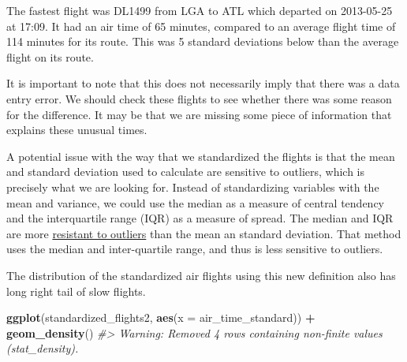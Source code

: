 \documentclass[]{book}
\newenvironment{Shaded}{\begin{snugshade}}{\end{snugshade}}
\newcommand{\CommentTok}[1]{\textcolor[rgb]{0.56,0.35,0.01}{\textit{#1}}}
\newcommand{\DataTypeTok}[1]{\textcolor[rgb]{0.13,0.29,0.53}{#1}}
\newcommand{\KeywordTok}[1]{\textcolor[rgb]{0.13,0.29,0.53}{\textbf{#1}}}
\newcommand{\NormalTok}[1]{#1}
\newcommand{\OperatorTok}[1]{\textcolor[rgb]{0.81,0.36,0.00}{\textbf{#1}}}
\newcommand{\StringTok}[1]{\textcolor[rgb]{0.31,0.60,0.02}{#1}}
\theoremstyle{plain}
\theoremstyle{remark}
\begin{document}
The fastest flight was DL1499 from LGA to
ATL which departed on
2013-05-25 at 17:09.
It had an air time of 65 minutes, compared to an average
flight time of 114 minutes for its route.
This was 5 standard deviations below
than the average flight on its route.

It is important to note that this does not necessarily imply that there was a data entry error.
We should check these flights to see whether there was some reason for the difference.
It may be that we are missing some piece of information that explains these unusual times.

A potential issue with the way that we standardized the flights is that the mean and standard deviation used to calculate are sensitive to outliers, which is precisely what we are
looking for.
Instead of standardizing variables with the mean and variance, we could use the median
as a measure of central tendency and the interquartile range (IQR) as a measure of spread.
The median and IQR are more \href{https://en.wikipedia.org/wiki/Robust_statistics}{resistant to outliers} than the mean an standard deviation.
That method uses the median and inter-quartile range, and thus is less sensitive to outliers.

\begin{Shaded}
\end{Shaded}

The distribution of the standardized air flights using this new definition
also has long right tail of slow flights.

\begin{Shaded}
\begin{Highlighting}[]
\KeywordTok{ggplot}\NormalTok{(standardized_flights2, }\KeywordTok{aes}\NormalTok{(}\DataTypeTok{x =}\NormalTok{ air_time_standard)) }\OperatorTok{+}
\StringTok{  }\KeywordTok{geom_density}\NormalTok{()}
\CommentTok{#> Warning: Removed 4 rows containing non-finite values (stat_density).}
\end{Highlighting}
\end{Shaded}
\end{document}
